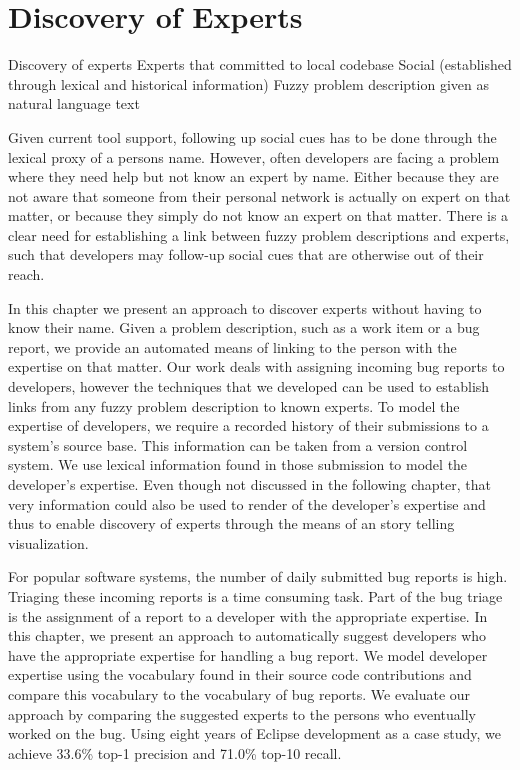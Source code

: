 
\chapter{Discovery of Experts}
\label{the chapter on bug reports}

\infobox
	{Discovery of experts}
	{Experts that committed to local codebase}
	{Social (established through lexical and historical information)}
	{Fuzzy problem description given as natural language text}

Given current tool support, following up social cues has to be done through the lexical proxy of a persons name. However, often developers are facing a problem where they need help but not know an expert by name. Either because they are not aware that someone from their personal network is actually on expert on that matter, or because they simply do not know an expert on that matter. There is a clear need for establishing a link between fuzzy problem descriptions and experts, such that developers may follow-up social cues that are otherwise out of their reach. 

In this chapter we present an approach to discover experts without having to know their name. Given a problem description, such as a work item or a bug report, we provide an automated means of linking to the person with the expertise on that matter. Our work deals with assigning incoming bug reports to developers, however the techniques that we developed can be used to establish links from any fuzzy problem description to known experts. To model the expertise of developers, we require a recorded history of their submissions to a system's source base. This information can be taken from a version control system. We use lexical information found in those submission to model the developer's expertise. Even though not discussed in the following chapter, that very information could also be used to render \EVOCLOUDS of the developer's expertise and thus to enable discovery of experts through the means of an story telling visualization.

\asteriskasteriskasterisk

For popular software systems, the number of daily submitted bug reports is high. Triaging these incoming reports is a time consuming task. Part of the bug triage is the assignment of a report to a developer with the appropriate expertise. In this chapter, we present an approach to automatically suggest developers who have the appropriate expertise for handling a bug report. We model developer expertise using the vocabulary found in their source code contributions and compare this vocabulary to the vocabulary of bug reports. We evaluate our approach by comparing the suggested experts to the persons who eventually worked on the bug. Using eight years of Eclipse development as a case study, we achieve 33.6\% top-1 precision and 71.0\% top-10 recall.

